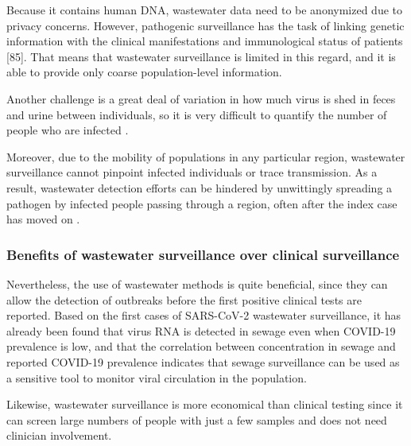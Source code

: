         Because it contains human DNA, wastewater data need to be anonymized due to privacy concerns. However,  pathogenic surveillance has the task of linking genetic information with the clinical manifestations and immunological status of patients [85]. That means that wastewater surveillance is limited in this regard, and it is able to provide only coarse population-level information.
        
        Another challenge is a great deal of variation in how much virus is shed in feces and urine between individuals, so it is very difficult to quantify the number of people who are infected \cite{farkas2020}.
         
        Moreover, due to the mobility of populations in any particular region, wastewater surveillance cannot pinpoint infected individuals or trace transmission. As a result, wastewater detection efforts can be hindered by unwittingly spreading a pathogen by infected people passing through a region, often after the index case has moved on \cite{ahmed2022}. 

        \subsubsection{Benefits of wastewater surveillance over clinical surveillance} 
        
        Nevertheless, the use of wastewater methods is quite beneficial, since they can allow the detection of outbreaks before the first positive clinical tests are reported. Based on the first cases of SARS-CoV-2 wastewater surveillance, it has already been found \cite{zhang2021} that virus RNA is detected in sewage even when COVID-19 prevalence is low, and that the correlation between concentration in sewage and reported COVID-19 prevalence indicates that sewage surveillance can be used as a sensitive tool to monitor viral circulation in the population.
         
        Likewise, wastewater surveillance is more economical than clinical testing since it can screen large numbers of people with just a few samples and does not need clinician involvement.
        
